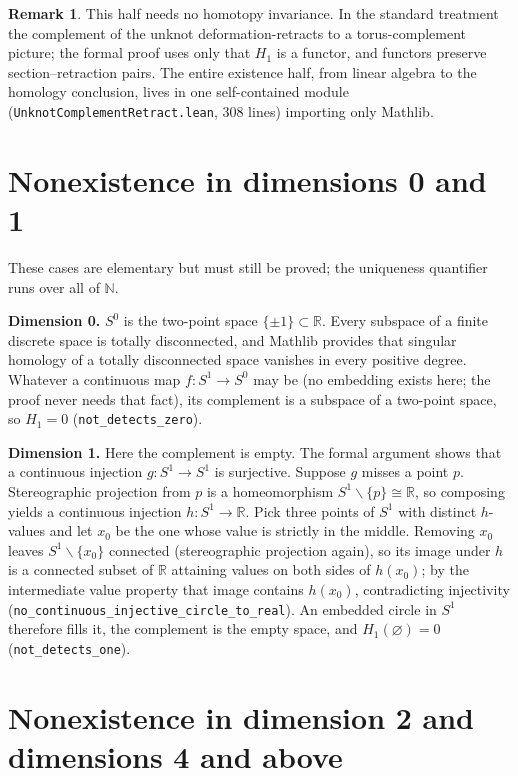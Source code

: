 \documentclass[11pt]{article}
\theoremstyle{definition}
\newtheorem{remark}[theorem]{Remark}
\newcommand{\R}{\mathbb{R}}
\newcommand{\N}{\mathbb{N}}
\newcommand{\Sph}[1]{S^{#1}}
\newcommand{\lean}[1]{\texttt{#1}}
\begin{document}
\begin{remark}
This half needs no homotopy invariance. In the standard treatment the complement of the unknot deformation-retracts to a torus-complement picture; the formal proof uses only that $H_1$ is a functor, and functors preserve section--retraction pairs. The entire existence half, from linear algebra to the homology conclusion, lives in one self-contained module (\lean{UnknotComplementRetract.lean}, 308 lines) importing only Mathlib.
\end{remark}

\section{Nonexistence in dimensions 0 and 1}
\label{sec:lowdim}

These cases are elementary but must still be proved; the uniqueness quantifier runs over all of $\N$.

\textbf{Dimension 0.} $\Sph{0}$ is the two-point space $\{\pm 1\} \subset \R$. Every subspace of a finite discrete space is totally disconnected, and Mathlib provides that singular homology of a totally disconnected space vanishes in every positive degree. Whatever a continuous map $f\colon S^1 \to \Sph{0}$ may be (no embedding exists here; the proof never needs that fact), its complement is a subspace of a two-point space, so $H_1 = 0$ (\lean{not\_detects\_zero}).

\textbf{Dimension 1.} Here the complement is empty. The formal argument shows that a continuous injection $g \colon S^1 \to S^1$ is surjective. Suppose $g$ misses a point $p$. Stereographic projection from $p$ is a homeomorphism $S^1 \smallsetminus \{p\} \cong \R$, so composing yields a continuous injection $h \colon S^1 \to \R$. Pick three points of $S^1$ with distinct $h$-values and let $x_0$ be the one whose value is strictly in the middle. Removing $x_0$ leaves $S^1 \smallsetminus \{x_0\}$ connected (stereographic projection again), so its image under $h$ is a connected subset of $\R$ attaining values on both sides of $h(x_0)$; by the intermediate value property that image contains $h(x_0)$, contradicting injectivity (\lean{no\_continuous\_injective\_circle\_to\_real}). An embedded circle in $\Sph{1}$ therefore fills it, the complement is the empty space, and $H_1(\varnothing) = 0$ (\lean{not\_detects\_one}).

\section{Nonexistence in dimension 2 and dimensions 4 and above}
\label{sec:highdim}
\end{document}
